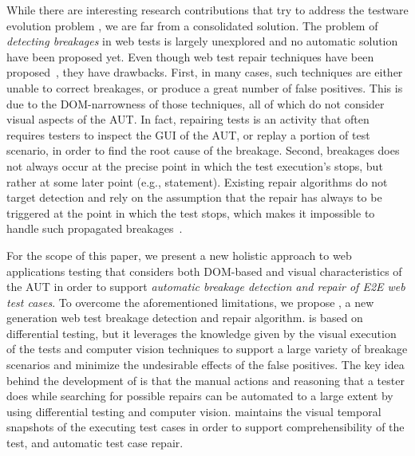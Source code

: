 While there are interesting research contributions that try to address the testware evolution problem \cite{2016-leotta-Advances,2014-leotta-WoSAR,2015-leotta-ICST,Thummalapenta:2013:ECT:2486788.2486926,Yandrapally:2014:RTA:2610384.2610390,Choudhary:2011:WWA:2002931.2002935,Hammoudi-2016-FSE}, we are far from a consolidated solution. 
The problem of \textit{detecting breakages} in web tests is largely unexplored and no automatic solution have been proposed yet. Even though web test repair techniques have been proposed~\cite{Choudhary:2011:WWA:2002931.2002935,Hammoudi-2016-FSE,2015-leotta-ICST}, they have drawbacks. 
First, in many cases, such techniques are either unable to correct breakages, or produce a great number of false positives. 
This is due to the DOM-narrowness of those techniques, all of which do not consider visual aspects of the AUT. In fact, repairing tests is an activity that often requires testers to inspect the GUI of the AUT, or replay a portion of test scenario, in order to find the root cause of the breakage.
Second, breakages does not always occur at the precise point in which the test execution's stops, but rather at some later point (e.g., statement). Existing repair algorithms do not target detection and rely on the assumption that the repair has always to be triggered at the point in which the test stops, which makes it impossible to handle such propagated breakages~\cite{Hammoudi-2016-ICST}.


For the scope of this paper, we present a new holistic approach to  web applications testing that considers both DOM-based and visual characteristics of the AUT in order to support \textit{automatic breakage detection and repair of E2E web test cases}. 
To overcome the aforementioned limitations, we propose \tool, a new generation web test breakage detection and repair algorithm. \tool is based on differential testing, but it leverages the knowledge given by the visual execution of the tests and computer vision techniques to support a large variety of breakage scenarios and minimize the undesirable effects of the false positives. The key idea behind the development of \tool is that the manual actions and reasoning that a tester does while searching for possible repairs can be automated to a large extent by using differential testing and computer vision. 
\tool maintains the visual temporal snapshots of the executing test cases in order to support comprehensibility of the test, and automatic test case repair.


